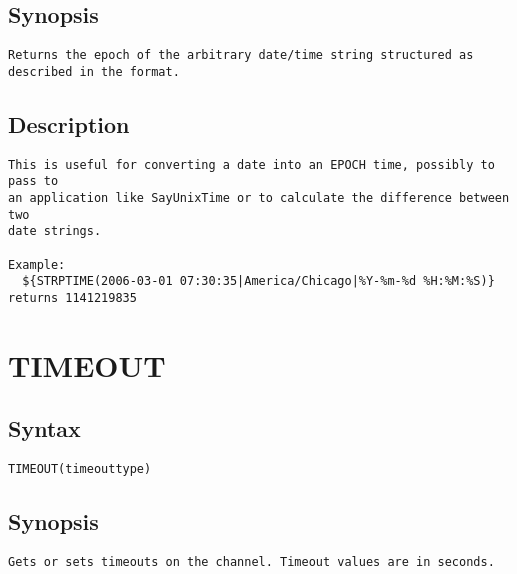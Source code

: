\subsection{Synopsis}
\begin{verbatim}
Returns the epoch of the arbitrary date/time string structured as described in the format.
\end{verbatim}
\subsection{Description}
\begin{verbatim}
This is useful for converting a date into an EPOCH time, possibly to pass to
an application like SayUnixTime or to calculate the difference between two
date strings.

Example:
  ${STRPTIME(2006-03-01 07:30:35|America/Chicago|%Y-%m-%d %H:%M:%S)} returns 1141219835

\end{verbatim}


\section{TIMEOUT}
\subsection{Syntax}
\begin{verbatim}
TIMEOUT(timeouttype)
\end{verbatim}
\subsection{Synopsis}
\begin{verbatim}
Gets or sets timeouts on the channel. Timeout values are in seconds.
\end{verbatim}
